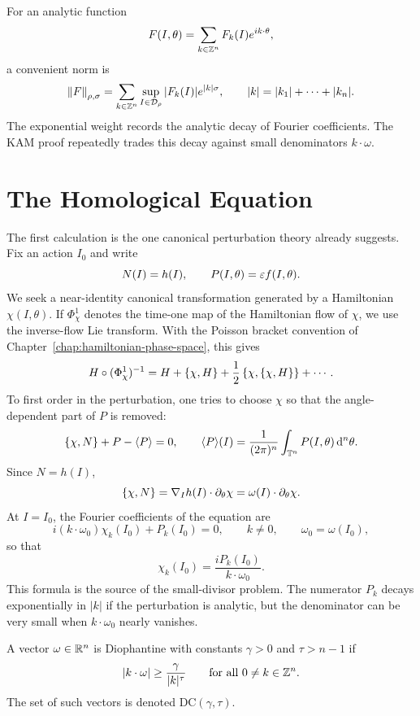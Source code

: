 For an analytic function
\[
        F(I,\theta)=\sum_{k\in\mathbb{Z}^n}F_k(I)e^{i k\cdot\theta},
\]
a convenient norm is
\[
        \left\lVert F\right\rVert_{\rho,\sigma}
        =
        \sum_{k\in\mathbb{Z}^n}\sup_{I\in\mathcal{D}_\rho}|F_k(I)|e^{|k|\sigma},
        \qquad |k|=|k_1|+\cdots+|k_n|.
\]
The exponential weight records the analytic decay of Fourier coefficients.
The KAM proof repeatedly trades this decay against small denominators
\(k\cdot\omega\).

\section{The Homological Equation}
\label{sec:kam-homological-equation}

The first calculation is the one canonical perturbation theory already
suggests.  Fix an action \(I_0\) and write
\[
        N(I)=h(I),\qquad P(I,\theta)=\varepsilon f(I,\theta).
\]
We seek a near-identity canonical transformation generated by a Hamiltonian
\(\chi(I,\theta)\).  If \(\Phi_\chi^1\) denotes the time-one map of the
Hamiltonian flow of \(\chi\), we use the inverse-flow Lie transform.  With the
Poisson bracket convention of Chapter~\ref{chap:hamiltonian-phase-space}, this
gives
\[
        H\circ(\Phi_\chi^1)^{-1}
        =
        H+\left\{\chi,H\right\}
        +\frac{1}{2}\left\{\chi,\left\{\chi,H\right\}\right\}+\cdots .
\]
To first order in the perturbation, one tries to choose \(\chi\) so that the
angle-dependent part of \(P\) is removed:
\[
        \left\{\chi,N\right\}+P-\langle P\rangle=0,
        \qquad
        \langle P\rangle(I)=\frac{1}{(2\pi)^n}\int_{\mathbb{T}^n}P(I,\theta)\,\mathrm{d}^n\theta .
\]
Since \(N=h(I)\),
\[
        \left\{\chi,N\right\}
        =
        \nabla_I h(I)\cdot \partial_\theta\chi
        =
        \omega(I)\cdot \partial_\theta\chi .
\]
At \(I=I_0\), the Fourier coefficients of the equation are
\[
        i(k\cdot \omega_0)\chi_k(I_0)+P_k(I_0)=0,
        \qquad k\ne0,\qquad \omega_0=\omega(I_0),
\]
so that
\[
        \chi_k(I_0)=\frac{iP_k(I_0)}{k\cdot\omega_0}.
\]
This formula is the source of the small-divisor problem.  The numerator
\(P_k\) decays exponentially in \(|k|\) if the perturbation is analytic, but
the denominator can be very small when \(k\cdot\omega_0\) nearly vanishes.

\begin{definition}
A vector \(\omega\in\mathbb{R}^n\) is Diophantine with constants
\(\gamma>0\) and \(\tau>n-1\) if
\[
        |k\cdot\omega|\ge \frac{\gamma}{|k|^\tau}
        \qquad \text{for all }0\ne k\in\mathbb{Z}^n .
\]
The set of such vectors is denoted \(\mathrm{DC}(\gamma,\tau)\).
\end{definition}

